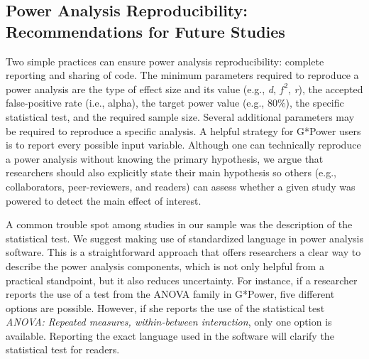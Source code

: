 \documentclass[
  man, donotrepeattitle,mask,floatsintext]{apa7}
\begin{document}
\hypertarget{power-analysis-reproducibility-recommendations-for-future-studies}{%
\subsection{Power Analysis Reproducibility: Recommendations for Future Studies}\label{power-analysis-reproducibility-recommendations-for-future-studies}}

Two simple practices can ensure power analysis reproducibility: complete reporting and sharing of code. The minimum parameters required to reproduce a power analysis are the type of effect size and its value (e.g., \emph{d}, \(f^2\), \emph{r}), the accepted false-positive rate (i.e., alpha), the target power value (e.g., 80\%), the specific statistical test, and the required sample size. Several additional parameters may be required to reproduce a specific analysis. A helpful strategy for G*Power users is to report every possible input variable. Although one can technically reproduce a power analysis without knowing the primary hypothesis, we argue that researchers should also explicitly state their main hypothesis so others (e.g., collaborators, peer-reviewers, and readers) can assess whether a given study was powered to detect the main effect of interest.

A common trouble spot among studies in our sample was the description of the statistical test. We suggest making use of standardized language in power analysis software. This is a straightforward approach that offers researchers a clear way to describe the power analysis components, which is not only helpful from a practical standpoint, but it also reduces uncertainty. For instance, if a researcher reports the use of a test from the ANOVA family in G*Power, five different options are possible. However, if she reports the use of the statistical test \emph{ANOVA: Repeated measures, within-between interaction}, only one option is available. Reporting the exact language used in the software will clarify the statistical test for readers.

\begingroup\fontsize{10}{12}\selectfont
\end{document}
